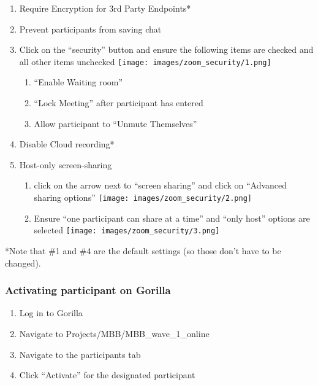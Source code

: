 \documentclass[
]{book}
\providecommand{\tightlist}{%
  \setlength{\itemsep}{0pt}\setlength{\parskip}{0pt}}
\begin{document}
\begin{enumerate}
\def\labelenumi{\arabic{enumi}.}
\tightlist
\item
  Require Encryption for 3rd Party Endpoints*
\item
  Prevent participants from saving chat
\item
  Click on the ``security'' button and ensure the following items are checked and all other items unchecked \texttt{[image: images/zoom\_security/1.png]}

  \begin{enumerate}
  \def\labelenumii{\alph{enumii}.}
  \tightlist
  \item
    ``Enable Waiting room''
  \item
    ``Lock Meeting'' after participant has entered
  \item
    Allow participant to ``Unmute Themselves''
  \end{enumerate}
\item
  Disable Cloud recording*
\item
  Host-only screen-sharing

  \begin{enumerate}
  \def\labelenumii{\alph{enumii}.}
  \tightlist
  \item
    click on the arrow next to ``screen sharing'' and click on ``Advanced sharing options'' \texttt{[image: images/zoom\_security/2.png]}
  \item
    Ensure ``one participant can share at a time'' and ``only host'' options are selected \texttt{[image: images/zoom\_security/3.png]}
  \end{enumerate}
\end{enumerate}

*Note that \#1 and \#4 are the default settings (so those don't have to be changed).

\hypertarget{activating-participant-on-gorilla}{%
\subsubsection{Activating participant on Gorilla}\label{activating-participant-on-gorilla}}

\begin{enumerate}
\def\labelenumi{\arabic{enumi}.}
\tightlist
\item
  Log in to Gorilla
\item
  Navigate to Projects/MBB/MBB\_wave\_1\_online
\item
  Navigate to the participants tab
\item
  Click ``Activate'' for the designated participant
\end{enumerate}
\end{document}

